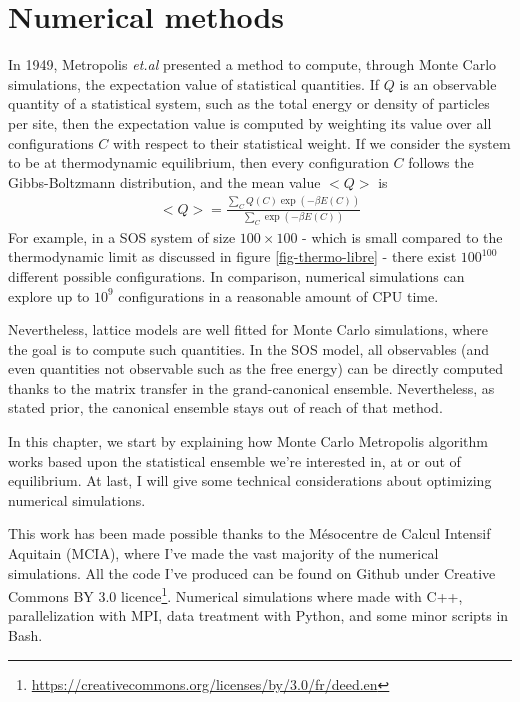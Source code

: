 \chapter{Numerical methods}
\label{chap-sim}

In 1949, Metropolis {\it et.al} \cite{metropolis_monte_1949} presented a method to compute, through Monte Carlo simulations, the expectation value of statistical quantities. If $Q$ is an observable quantity of a statistical system, such as the total energy or density of particles per site, then the expectation value is computed by weighting its value over all configurations $C$ with respect to their statistical weight. If we consider the system to be at thermodynamic equilibrium, then every configuration $C$ follows the Gibbs-Boltzmann distribution, and the mean value $<Q>$ is
\begin{align}
    <Q> = \frac{\sum_{C} Q(C) \exp(-\beta E(C))}{\sum_{C} \exp(-\beta E(C))}
\end{align}
For example, in a SOS system of size $100\times100$ - which is small compared to the thermodynamic limit as discussed in figure \ref{fig-thermo-libre} - there exist $100^{100}$ different possible configurations. In comparison, numerical simulations can explore up to $10^9$ configurations in a reasonable amount of CPU time.

Nevertheless, lattice models are well fitted for Monte Carlo simulations, where the goal is to compute such quantities. In the SOS model, all observables (and even quantities not observable such as the free energy) can be directly computed thanks to the matrix transfer in the grand-canonical ensemble. Nevertheless, as stated prior, the canonical ensemble stays out of reach of that method.

In this chapter, we start by explaining how Monte Carlo Metropolis algorithm works based upon the statistical ensemble we're interested in, at or out of equilibrium.
At last, I will give some technical considerations about optimizing numerical simulations.

This work has been made possible thanks to the Mésocentre de Calcul Intensif Aquitain (MCIA)\cite{noauthor_mesocentre_nodate}, where I've made the vast majority of the numerical simulations.
All the code I've produced can be found on Github \cite{gersberg_github_2020} under Creative Commons BY 3.0 licence\footnote{\url{https://creativecommons.org/licenses/by/3.0/fr/deed.en}}. Numerical simulations where made with C++, parallelization with MPI, data treatment with Python, and some minor scripts in Bash.


